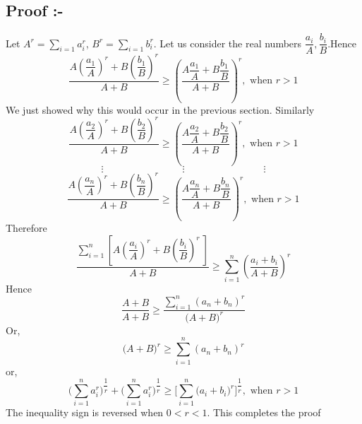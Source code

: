\documentclass[12pt]{article}
\begin{document}
	\pagebreak 


\subsection{Proof :-}
\Large{Let $A^r=\displaystyle{\sum\limits_{i=1}a_i^r}$,  $B^r=\displaystyle{\sum\limits_{i=1}b_i^r}$. Let us consider the real numbers $\dfrac{a_i}{A},\dfrac{b_i}{B}.$Hence \[\dfrac{A\left( \dfrac{a_1}{A}\right)^r+B\left( \dfrac{b_1}{B}\right) ^r}{A+B}\geq\left( \dfrac{A \dfrac{a_1}{A}+B \dfrac{b_1}{B} }{A+B}\right) ^r,\text{ when }r>1\]We just showed why this would occur in the previous section. Similarly\[\dfrac{A\left( \dfrac{a_2}{A}\right)^r+B\left( \dfrac{b_2}{B}\right) ^r}{A+B}\geq\left( \dfrac{A \dfrac{a_2}{A}+B \dfrac{b_2}{B} }{A+B}\right)^r,\text{ when }r>1\] \[\vdots\qquad\qquad\qquad\qquad \vdots \qquad\qquad\qquad\qquad \vdots\] \[\dfrac{A\left( \dfrac{a_n}{A}\right)^r+B\left( \dfrac{b_n}{B}\right) ^r}{A+B}\geq\left( \dfrac{A \dfrac{a_n}{A}+B \dfrac{b_n}{B} }{A+B}\right)^r,\text{ when }r>1\] Therefore\[\dfrac{\displaystyle{\sum\limits_{i=1}^{n}} \left[A\left( \dfrac{a_i}{A}\right)^r +B \left( \dfrac{b_i}{B}\right)^r\ \right]  }{A+B}\geq \sum\limits_{i=1}^{n}\left( \dfrac{a_i+b_i }{A+B}\right)^r \]Hence\[\dfrac{A +B}{A+B}\geq \dfrac{\sum\limits_{i=1}^{n}\left( a_n+b_n \right)^r}{\Big(A+B\Big)^r} \]Or,\[\Big(A+B\Big)^r\geq\sum\limits_{i=1}^{n}\left( a_n+b_n \right)^r \]or, \[
\Bigg(\sum_{i=1}^na_{i}^{r}\Bigg)^{\dfrac{1}{r}}+\Bigg(\sum_{i=1}^na_{i}^{r}\Bigg)^{\dfrac{1}{r}}
\geq\Bigg[\sum_{i=1}^n\big(a_{i}+b_i\big)^{r}\Bigg]^{\dfrac{1}{r}}, \text{ when } r>1\]The inequality sign is reversed when $0<r<1$. This completes the proof}
\end{document}
